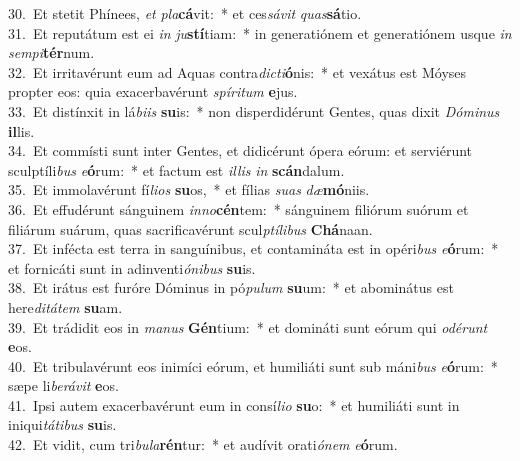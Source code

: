 {30.~}Et stetit Phínees, \textit{et} \textit{pla}\textbf{cá}vit:~* et ces\textit{sá}\textit{vit} \textit{quas}\textbf{sá}tio.\\
{31.~}Et reputátum est ei \textit{in} \textit{ju}\textbf{stí}tiam:~* in generatiónem et generatiónem usque \textit{in} \textit{sem}\textit{pi}\textbf{tér}num.\\
{32.~}Et irritavérunt eum ad Aquas contra\textit{di}\textit{cti}\textbf{ó}nis:~* et vexátus est Móyses propter eos: quia exacerbavérunt \textit{spí}\textit{ri}\textit{tum} \textbf{e}jus.\\
{33.~}Et distínxit in lá\textit{bi}\textit{is} \textbf{su}is:~* non disperdidérunt Gentes, quas dixit \textit{Dó}\textit{mi}\textit{nus} \textbf{il}lis.\\
{34.~}Et commísti sunt inter Gentes, et didicérunt ópera eórum: et serviérunt sculptíli\textit{bus} \textit{e}\textbf{ó}rum:~* et factum est \textit{il}\textit{lis} \textit{in} \textbf{scán}dalum.\\
{35.~}Et immolavérunt fí\textit{li}\textit{os} \textbf{su}os,~* et fílias \textit{su}\textit{as} \textit{dæ}\textbf{mó}niis.\\
{36.~}Et effudérunt sánguinem \textit{in}\textit{no}\textbf{cén}tem:~* sánguinem filiórum suórum et filiárum suárum, quas sacrificavérunt scul\textit{ptí}\textit{li}\textit{bus} \textbf{Chá}naan.\\
{37.~}Et infécta est terra in sanguínibus, et contamináta est in opéri\textit{bus} \textit{e}\textbf{ó}rum:~* et fornicáti sunt in adinventi\textit{ó}\textit{ni}\textit{bus} \textbf{su}is.\\
{38.~}Et irátus est furóre Dóminus in pó\textit{pu}\textit{lum} \textbf{su}um:~* et abominátus est here\textit{di}\textit{tá}\textit{tem} \textbf{su}am.\\
{39.~}Et trádidit eos in \textit{ma}\textit{nus} \textbf{Gén}tium:~* et domináti sunt eórum qui \textit{o}\textit{dé}\textit{runt} \textbf{e}os.\\
{40.~}Et tribulavérunt eos inimíci eórum, et humiliáti sunt sub máni\textit{bus} \textit{e}\textbf{ó}rum:~* sæpe li\textit{be}\textit{rá}\textit{vit} \textbf{e}os.\\
{41.~}Ipsi autem exacerbavérunt eum in consí\textit{li}\textit{o} \textbf{su}o:~* et humiliáti sunt in iniqui\textit{tá}\textit{ti}\textit{bus} \textbf{su}is.\\
{42.~}Et vidit, cum tri\textit{bu}\textit{la}\textbf{rén}tur:~* et audívit orati\textit{ó}\textit{nem} \textit{e}\textbf{ó}rum.\\
